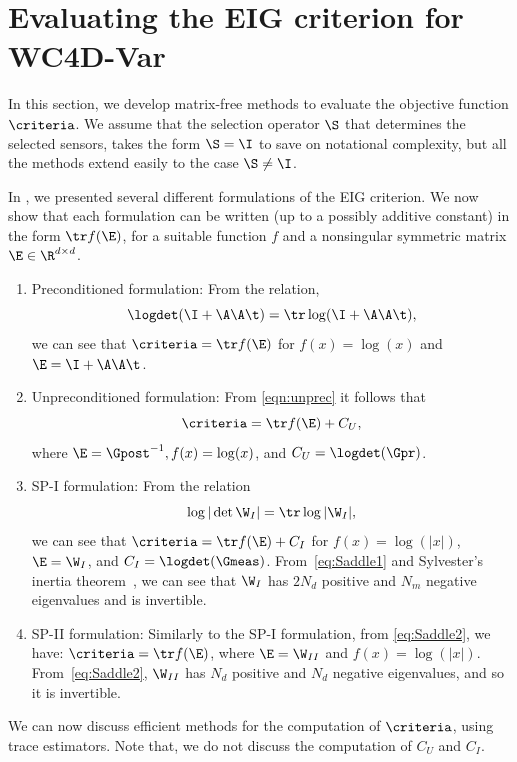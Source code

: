 \documentclass{aims} %
\theoremstyle{definition}
\begin{document}
\section{Evaluating the EIG  criterion for  WC4D-Var}\label{sec:preclanc}
In this section, we develop matrix-free methods to evaluate the objective function $\criteria$. We assume that the selection operator $\S$ that determines the selected sensors, takes the form $\S = \I$ to save on notational complexity, but all the methods extend easily to the case $\S \neq \I$. 

In , we presented several different formulations of the EIG criterion. We now show that each formulation can be written (up to a possibly additive constant) in the form $\tr f(\E)$, for a suitable function $f$ and a nonsingular symmetric  matrix $\E \in \R^{d\times d}$.


\begin{enumerate}
    \item Preconditioned formulation: From the relation, 
    \[ \logdet(\I + \A\A\t) = \tr\log(\I + \A\A\t),\]
    we can see that $\criteria = \tr f(\E)$ for $f(x) = \log(x)$ and $\E = \I+\A\A\t$. 
    \item Unpreconditioned formulation: From  \eqref{eqn:unprec} it follows that  
    \[\criteria = \tr f(\E) +C_U,\] where  
    $\E = \Gpost^{-1}, f(x)= \log(x)$, and $C_U = \logdet(\Gpr)$.  
    \item SP-I formulation: From the relation
    \[ \log|\det\W_I| = \tr\log| \W_I|, \]
 we can see that $\criteria = \tr f(\E) + C_I$ for $f(x) = \log(|x|)$,  $\E = \W_I$, and $C_{I} = \logdet(\Gmeas)$. From~\eqref{eq:Saddle1} and Sylvester's inertia theorem~\cite[Theorem 4.5.8]{horn2013matrix}, we can see that $\W_I$ has $2N_d$ positive and $N_m$ negative eigenvalues and is invertible.
    \item SP-II formulation: Similarly to the SP-I formulation,  from  \eqref{eq:Saddle2}, we have:  $\criteria = \tr f(\E)$, where  $\E = \W_{II}$ and $f(x) = \log(|x|)$. From~\eqref{eq:Saddle2}, $\W_{II}$ has $N_d$ positive and $N_d$ negative eigenvalues, and so it is invertible.
\end{enumerate}

We can now discuss efficient methods for the computation of $\criteria$, using trace estimators. Note that, we do not discuss the computation of $C_U$ and $C_I$.
\end{document}
